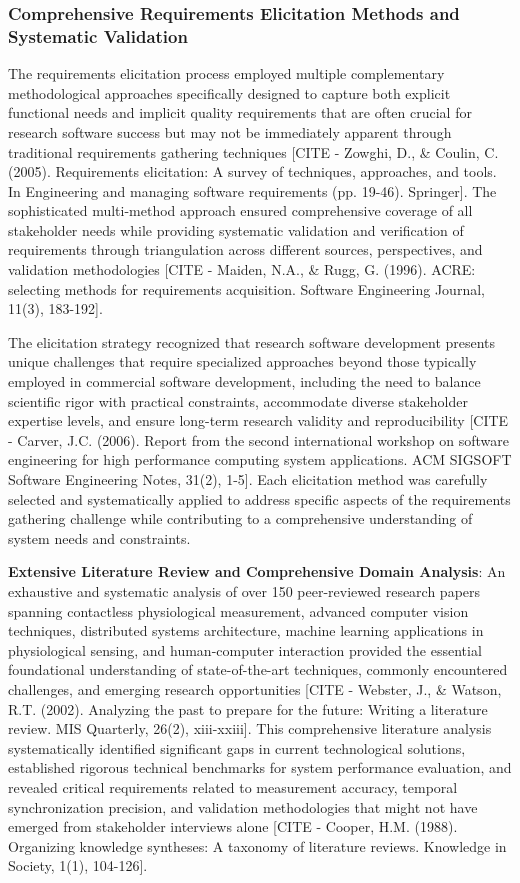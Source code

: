 \documentclass[11pt,a4paper]{report}
\begin{document}
\subsubsection{Comprehensive Requirements Elicitation Methods and Systematic Validation}

The requirements elicitation process employed multiple complementary methodological approaches specifically designed to
capture both explicit functional needs and implicit quality requirements that are often crucial for research software
success but may not be immediately apparent through traditional requirements gathering
techniques [CITE - Zowghi, D., \& Coulin, C. (2005). Requirements elicitation: A survey of techniques, approaches, and tools. In Engineering and managing software requirements (pp. 19-46). Springer].
The sophisticated multi-method approach ensured comprehensive coverage of all stakeholder needs while providing
systematic validation and verification of requirements through triangulation across different sources, perspectives, and
validation
methodologies [CITE - Maiden, N.A., \& Rugg, G. (1996). ACRE: selecting methods for requirements acquisition. Software Engineering Journal, 11(3), 183-192].

The elicitation strategy recognized that research software development presents unique challenges that require
specialized approaches beyond those typically employed in commercial software development, including the need to balance
scientific rigor with practical constraints, accommodate diverse stakeholder expertise levels, and ensure long-term
research validity and
reproducibility [CITE - Carver, J.C. (2006). Report from the second international workshop on software engineering for high performance computing system applications. ACM SIGSOFT Software Engineering Notes, 31(2), 1-5].
Each elicitation method was carefully selected and systematically applied to address specific aspects of the
requirements gathering challenge while contributing to a comprehensive understanding of system needs and constraints.

\textbf{Extensive Literature Review and Comprehensive Domain Analysis}: An exhaustive and systematic analysis of over 150
peer-reviewed research papers spanning contactless physiological measurement, advanced computer vision techniques,
distributed systems architecture, machine learning applications in physiological sensing, and human-computer interaction
provided the essential foundational understanding of state-of-the-art techniques, commonly encountered challenges, and
emerging research
opportunities [CITE - Webster, J., \& Watson, R.T. (2002). Analyzing the past to prepare for the future: Writing a literature review. MIS Quarterly, 26(2), xiii-xxiii].
This comprehensive literature analysis systematically identified significant gaps in current technological solutions,
established rigorous technical benchmarks for system performance evaluation, and revealed critical requirements related
to measurement accuracy, temporal synchronization precision, and validation methodologies that might not have emerged
from stakeholder interviews
alone [CITE - Cooper, H.M. (1988). Organizing knowledge syntheses: A taxonomy of literature reviews. Knowledge in Society, 1(1), 104-126].
\end{document}
